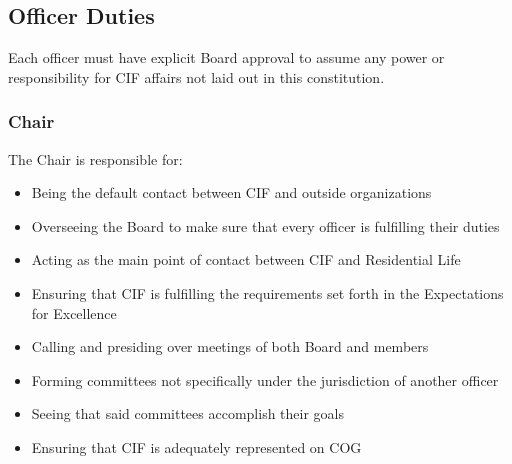 \documentclass[12pt]{amsart}
\begin{document}
	\subsection {Officer Duties}
	Each officer must have explicit Board approval to assume any power or responsibility for CIF affairs not laid out in this constitution.
		\subsubsection {Chair}
The Chair is responsible for:
\begin{itemize}
	\item Being the default contact between CIF and outside organizations
	\item Overseeing the Board to make sure that every officer is fulfilling their duties
	\item Acting as the main point of contact between CIF and Residential Life
	\item Ensuring that CIF is fulfilling the requirements set forth in the Expectations for Excellence
	\item Calling and presiding over meetings of both Board and members
	\item Forming committees not specifically under the jurisdiction of another officer
	\item Seeing that said committees accomplish their goals
	\item Ensuring that CIF is adequately represented on COG 
\end{itemize}
\end{document}
